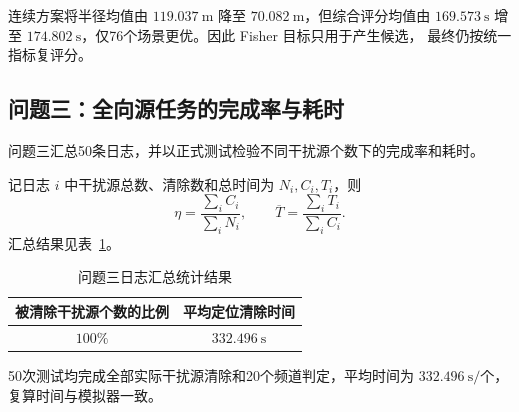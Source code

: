 连续方案将半径均值由 $119.037\ \mathrm m$ 降至 $70.082\ \mathrm m$，但综合评分均值由
$169.573\ \mathrm s$ 增至 $174.802\ \mathrm s$，仅76个场景更优。因此 Fisher 目标只用于产生候选，
最终仍按统一指标复评分。

\subsection{问题三：全向源任务的完成率与耗时}

问题三汇总50条日志，并以正式测试检验不同干扰源个数下的完成率和耗时。


记日志 $i$ 中干扰源总数、清除数和总时间为 $N_i,C_i,T_i$，则
\[
  \eta=\frac{\sum_i C_i}{\sum_i N_i},
  \qquad
  \overline T=\frac{\sum_i T_i}{\sum_i C_i}.
\]
汇总结果见表~\ref{tab:q3-log-statistics}。

\begin{table}[H]
  \centering
  \caption{问题三日志汇总统计结果}
  \label{tab:q3-log-statistics}
  \small
  \renewcommand{\arraystretch}{1.15}
  \begin{tabular}{cc}
    \toprule
    被清除干扰源个数的比例 & 平均定位清除时间 \\
    \midrule
    $100\%$ & $332.496\ \mathrm s$ \\
    \bottomrule
  \end{tabular}
\end{table}
50次测试均完成全部实际干扰源清除和20个频道判定，平均时间为
$332.496\ \mathrm s/\text{个}$，复算时间与模拟器一致。

